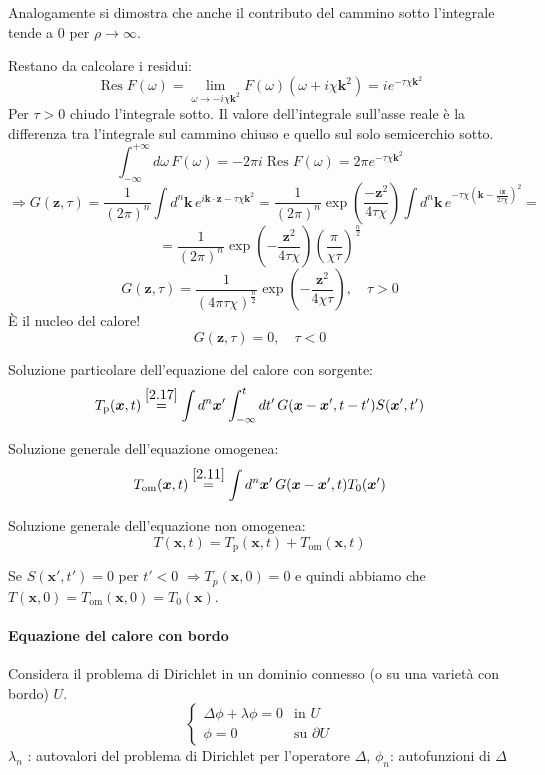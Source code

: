 \documentclass[a4paper,11pt]{report}
\newcommand{\x}{\boldsymbol{x}}
\newcommand{\kk}{\boldsymbol{k}}
\newcommand{\z}{\boldsymbol{z}}
\begin{document}
Analogamente si dimostra che anche il contributo del cammino sotto l'integrale tende a 0 per $\rho\to\infty$.

\thinspace

Restano da calcolare i residui:
\[
\operatorname{Res}F(\omega)=\lim_{\omega \to -i\chi \kk^2} F(\omega) (\omega + i\chi \kk^2)=ie^{-\tau\chi \kk ^2}
\]
Per $\tau>0$ chiudo l'integrale sotto. Il valore dell'integrale sull'asse reale \`e la differenza tra l'integrale sul cammino chiuso e quello sul solo semicerchio sotto.
\[
\int_{-\infty}^{+\infty}d\omega\, F(\omega)=-2\pi i \operatorname{Res}F(\omega)=2\pi e^{-\tau\chi\kk ^2}
\]
\[
\Rightarrow G(\z,\tau)=\frac{1}{(2\pi)^n}\int d^n\kk\, e^{i\kk\cdot \z-\tau\chi\kk ^2} =\frac{1}{(2\pi)^n}\exp\left(\frac{-\z^2}{4\tau\chi}\right) \int d^n\kk \, e^{-\tau\chi\left(\kk -\frac{i\z}{2\tau\chi}\right)^2}=
\]
\[
=\frac{1}{(2\pi)^n}\exp\left(-\frac{\z^2}{4\tau\chi}\right)\left( \frac{\pi}{\chi\tau} \right)^\frac{n}{2}
\]
\begin{equation}
G(\z,\tau)=\frac{1}{(4\pi\tau\chi)^\frac{n}{2}}\exp\left(-\frac{\z^2}{4\chi\tau}\right), \quad \tau>0
\end{equation}
\`E il nucleo del calore!
\begin{equation}
G(\z,\tau)=0,\quad \tau<0
\end{equation}

Soluzione particolare dell'equazione del calore con sorgente:
\[
T_\text{p}(\x,t)\overset{\eqref{2.17}}{=}\int d^n\x'\int_{-\infty}^{t}dt'\,G(\x-\x',t-t')S(\x',t')
\]

Soluzione generale dell'equazione omogenea:
\[
T_\text{om}(\x,t)\overset{\eqref{2.11}}{=}\int d^n\x'\,G(\x-\x',t)T_0(\x')
\]

Soluzione generale dell'equazione non omogenea:
\[
T(\x,t)=T_\text{p}(\x,t)+T_\text{om}(\x,t)
\]

Se $S(\x',t')=0$ per $t'<0$ $\Rightarrow T_p(\x,0)=0$ e quindi abbiamo che $T(\x,0)=T_\text{om}(\x,0)=T_0(\x)$.

\paragraph{Equazione del calore con bordo}

Considera il problema di Dirichlet in un dominio connesso (o su una variet\`a con bordo) $U$.
\[
\begin{cases}
\Delta \phi + \lambda\phi =0 & \text{in } U \\
\phi=0 & \text{su }\partial U
\end{cases}
\]
$\lambda_n$ : autovalori del problema di Dirichlet per l'operatore $\Delta$, $\phi_n$: autofunzioni di $\Delta$
\end{document}
